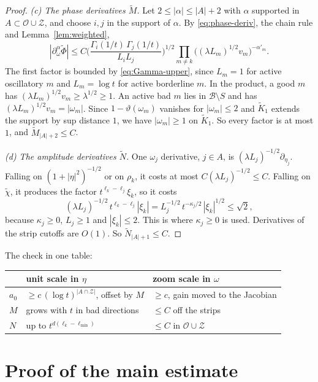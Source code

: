 \documentclass[11pt]{article}
\theoremstyle{remark}
\begin{document}
\begin{proof}
	\emph{(c) The phase derivatives $\tilde M$.} Let $2\le|\alpha|\le|A|+2$ with
	$\alpha$ supported in $A\subset\mathcal O\cup\mathcal Z$, and choose $i,j$ in the
	support of $\alpha$. By \eqref{eq:phase-deriv}, the chain rule and
	Lemma~\ref{lem:weighted},
	\[
	|\partial_\omega^\alpha\tilde\Phi|
	\le C\Big(\frac{\Gamma_i(1/t)\,\Gamma_j(1/t)}{L_iL_j}\Big)^{1/2}
	\prod_{m\ne k}\big((\lambda L_m)^{1/2}v_m\big)^{-\alpha'_m}.
	\]
	The first factor is bounded by \eqref{eq:Gamma-upper}, since $L_m=1$ for active
	oscillatory $m$ and $L_m=\log t$ for active borderline $m$. In the product, a good
	$m$ has $(\lambda L_m)^{1/2}v_m\ge\lambda^{1/2}\ge1$. An active bad $m$ lies in
	$\mathcal B\setminus S$ and has $(\lambda L_m)^{1/2}v_m=|\omega_m|$. Since
	$1-\vartheta(\omega_m)$ vanishes for $|\omega_m|\le2$ and $\tilde K_1$ extends the
	support by sup distance $1$, we have $|\omega_m|\ge1$ on $\tilde K_1$. So every
	factor is at most $1$, and $\tilde M_{|A|+2}\le C$.

	\emph{(d) The amplitude derivatives $\tilde N$.} One $\omega_j$ derivative, $j\in
	A$, is $(\lambda L_j)^{-1/2}\partial_{\eta_j}$. Falling on $(1+|\eta|^2)^{-1/2}$ or
	on $\rho_k$, it costs at most $C(\lambda L_j)^{-1/2}\le C$. Falling on
	$\tilde\chi$, it produces the factor $t^{\ell_k-\ell_j}\xi_k$, so it costs
	\[
	(\lambda L_j)^{-1/2}\,t^{\ell_k-\ell_j}|\xi_k|=L_j^{-1/2}\,t^{-\kappa_j/2}\,|\xi_k|^{1/2}
	\le\sqrt2 ,
	\]
	because $\kappa_j\ge0$, $L_j\ge1$ and $|\xi_k|\le2$. This is where $\kappa_j\ge0$
	is used. Derivatives of the strip cutoffs are $O(1)$. So
	$\tilde N_{|A|+1}\le C$.
\end{proof}

The check in one table:

\begin{center}
\begin{tabular}{lll}
	& unit scale in $\eta$ & zoom scale in $\omega$\\\hline
	$a_0$ & $\ge c\,(\log t)^{|A\cap\mathcal Z|}$, offset by $M$ & $\ge c$, gain moved to the Jacobian\\
	$M$ & grows with $t$ in bad directions & $\le C$ off the strips\\
	$N$ & up to $t^{d(\ell_k-\ell_{\min})}$ & $\le C$ in $\mathcal O\cup\mathcal Z$\\
\end{tabular}
\end{center}

\section{Proof of the main estimate}\label{sec:proof}
\end{document}
